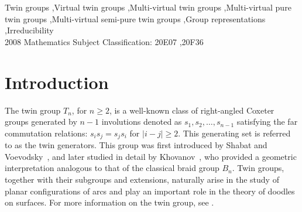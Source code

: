 \documentclass[preprint]{elsarticle}
\begin{document}

\begin{abstract}
Motivated by the notion of the multi-virtual braid group introduced by L. Kauffman, and by the study of extensions of the well-known twin group $T_n, n\geq 2$, we introduce a new group called the multi-virtual twin group $M_kVT_n$, where $k \geq 1$ and $n \geq 2$, together with two associated subgroups: the multi-virtual pure twin group $M_kVPT_n$ and the multi-virtual semi-pure twin group $M_kVHT_n$. We then classify all homogeneous $2$-local representations of $M_kVT_n$ into $\mathrm{GL}_n(\mathbb{C})$ for all $k\geq 1$ and $n\geq 3$, and show that they fall into exactly eight distinct types. We also investigate their main properties, including faithfulness and irreducibility, proving that they are generally unfaithful and providing necessary and sufficient conditions for their irreducibility. Furthermore, for certain values of $k$ and $n$, we construct non-local representations of $M_kVPT_n$ induced from those of $M_kVT_n$, and we determine the conditions under which these induced representations are irreducible. Finally, we present several problems for future research in this area.
\end{abstract}
\begin{keyword}
     Twin groups \sep Virtual twin groups \sep Multi-virtual twin groups \sep Multi-virtual pure twin groups \sep Multi-virtual semi-pure twin groups \sep Group representations \sep Irreducibility\\
    2008 Mathematics Subject Classification: 20E07 \sep 20F36
\end{keyword}
\maketitle



\section{Introduction}
The twin group $T_n$, for $n \geq 2$, is a well-known class of right-angled Coxeter groups generated by $n-1$ involutions denoted as $s_1, s_2, \dots, s_{n-1}$ satisfying the far commutation relations: $s_is_j = s_js_i$ for $|i-j| \geq 2$. This generating set is referred to as the twin generators. This group was first introduced by Shabat and Voevodsky~\cite{SV}, and later studied in detail by Khovanov~\cite{M.Khovanov1996, MK}, who provided a geometric interpretation analogous to that of the classical braid group $B_n$. Twin groups, together with their subgroups and extensions, naturally arise in the study of planar configurations of arcs and play an important role in the theory of doodles on surfaces. For more information on the twin group, see \cite{Merkov1999,BSV,Mosto2020,TNM11}.\vspace{0.1cm}
\end{document}
